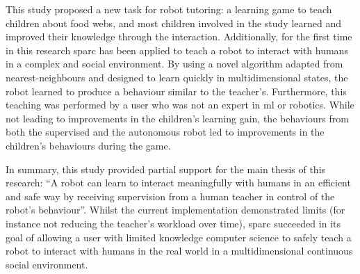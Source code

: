 This study proposed a new task for robot tutoring: a learning game to teach children about food webs, and most children involved in the study learned and improved their knowledge through the interaction. Additionally, for the first time in this research \gls{sparc} has been applied to teach a robot to interact with humans in a complex and social environment. By using a novel algorithm adapted from nearest-neighbours and designed to learn quickly in multidimensional states, the robot learned to produce a behaviour similar to the teacher's. Furthermore, this teaching was performed by a user who was not an expert in \gls{ml} or robotics. While not leading to improvements in the children's learning gain, the behaviours from both the supervised and the autonomous robot led to improvements in the children's behaviours during the game. 

In summary, this study provided partial support for the main thesis of this research: ``A robot can learn to interact meaningfully with humans in an efficient and safe way by receiving supervision from a human teacher in control of the robot's behaviour''. Whilst the current implementation demonstrated limits (for instance not reducing the teacher's workload over time), \gls{sparc} succeeded in its goal of allowing a user with limited knowledge computer science to safely teach a robot to interact with humans in the real world in a multidimensional continuous social environment. 